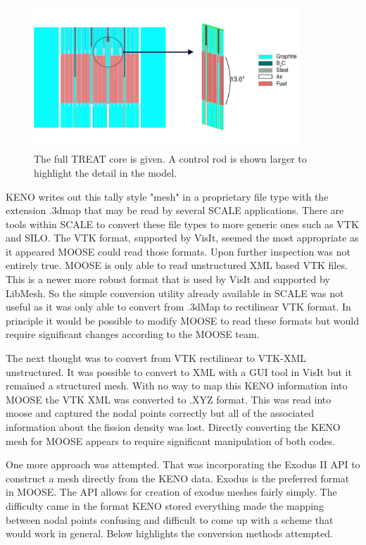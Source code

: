 \documentclass[11pt]{article}
\begin{document}
\begin{figure}[h]
    \centering
    \includegraphics[width=10cm]{figures/big_to_small}
    \caption{The full TREAT core is given.  A control rod is shown larger to highlight the detail in the model.}
    \label{fig:treat3d}
\end{figure}

KENO writes out this tally style "mesh" in a proprietary file type with the extension .3dmap that may be read by several SCALE applications.  There are tools within SCALE to convert these file types to more generic ones such as VTK and SILO.  The VTK format, supported by VisIt, seemed the most appropriate as it appeared MOOSE could read those formats.  Upon further inspection was not entirely true. MOOSE is only able to read unstructured XML based VTK files.  This is a newer more robust format that is used by VisIt and supported by LibMesh.  So the simple conversion utility already available in SCALE was not useful as it was only able to convert from .3dMap to rectilinear VTK format.  In principle it would be possible to modify MOOSE to read these formats but would require significant changes according to the MOOSE team.  

The next thought was to convert from VTK rectilinear to VTK-XML unstructured.  It was possible to convert to XML with a GUI tool in VisIt but it remained a structured mesh.  With no way to map this KENO information into MOOSE the VTK XML was converted to .XYZ format.  This was read into moose and captured the nodal points correctly but all of the associated information about the fission density was lost. Directly converting the KENO mesh for MOOSE appears to require significant manipulation of both codes.

One more approach was attempted. That was incorporating the Exodus II API to construct a mesh directly from the KENO data.  Exodus is the preferred format in MOOSE.  The API allows for creation of exodus meshes fairly simply.  The difficulty came in the format KENO stored everything made the mapping between nodal points confusing and difficult to come up with a scheme that would work in general.  
Below highlights the conversion methods attempted.
\end{document}
